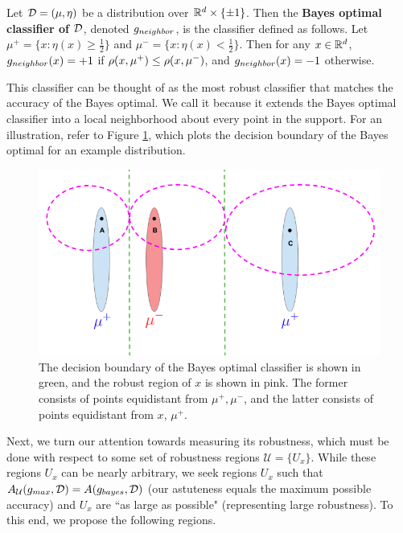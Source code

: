 \begin{defn}\label{defn:includes_mu_plus_and_minus}
Let ${\mathcal D} = (\mu, \eta)$ be a distribution over $\mathbb R^d \times \{\pm 1\}$. Then the \textbf{\natural\emph{ }Bayes optimal classifier of ${\mathcal D}$}, denoted $g_{neighbor}$, is the classifier defined as follows. Let $\mu^+ = \{x: \eta(x) \geq \frac{1}{2}\}$ and $\mu^- = \{x: \eta(x) < \frac{1}{2}\}$. Then for any $x \in \mathbb R^d$, $g_{neighbor}(x) = +1$ if $\rho(x, \mu^+) \leq \rho(x, \mu^-)$, and $g_{neighbor}(x) = -1$ otherwise. 
\end{defn}

This classifier can be thought of as the most robust classifier that matches the accuracy of the Bayes optimal. We call it \textit{\natural} because it extends the Bayes optimal classifier into a local neighborhood about every point in the support. For an illustration, refer to Figure \ref{fig:decision_boundary2}, which plots the decision boundary of the \natural\emph{ }Bayes optimal for an example distribution. 

\begin{figure}
    \centering
        \includegraphics[scale=0.30] {decision_boundary.png}
    \caption{The decision boundary of the \natural\emph{ }Bayes optimal classifier is shown in green,  and the \natural\emph{ }robust region of $x$ is shown in pink. The former consists of points equidistant from $\mu^+, \mu^-$, and the latter consists of points equidistant from $x$, $\mu^+$.}
    \label{fig:decision_boundary2}
\end{figure}

Next, we turn our attention towards measuring its robustness, which must be done with respect to some set of robustness regions $\mathcal{U} = \{U_x\}$. While these regions $U_x$ can be nearly arbitrary, we seek regions $U_x$ such that $A_{\mathcal U}(g_{max}, {\mathcal D}) = A(g_{bayes}, {\mathcal D})$ (our astuteness equals the maximum possible accuracy) and $U_x$ are ``as large as possible" (representing large robustness). To this end, we propose the following regions.

